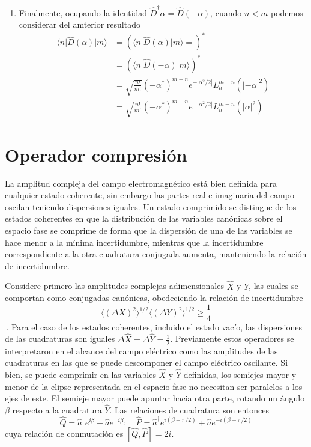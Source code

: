 \begin{enumerate}
  \item Finalmente, ocupando la identidad $\hat{D}^\dagger{\alpha} = \hat{D}(-\alpha)$, cuando $n<m$ podemos considerar del amterior resultado
        \begin{align*}
          \langle n \vert \hat{D}(\alpha)\vert m\rangle & = \left( \langle n \vert \hat{D}(\alpha) \vert m\rangle = \right)^{*}            \\
                                                        & = \left( \langle n \vert \hat{D}(-\alpha) \vert m\rangle \right)^{*}             \\
                                                        & = \sqrt{\frac{n!}{m!}}(-\alpha^*)^{m-n} e^{-|\alpha^2/2|}L_n^{m-n} (|-\alpha|^2) \\
                                                        & = \sqrt{\frac{n!}{m!}}(-\alpha^*)^{m-n} e^{-|\alpha^2/2|}L_n^{m-n} (|\alpha|^2)
        \end{align*}
\end{enumerate}

\section{Operador compresión}


La amplitud compleja del campo electromagnético está bien definida para cualquier estado coherente, sin embargo las partes real e imaginaria del campo oscilan teniendo dispersiones iguales. Un estado comprimido se distingue de los estados coherentes en que la distribución de las variables canónicas sobre el espacio fase se comprime de forma que la dispersión de una de las variables se hace menor a la mínima incertidumbre, mientras que la incertidumbre correspondiente a la otra cuadratura conjugada aumenta, manteniendo la relación de incertidumbre.

Considere primero las amplitudes complejas adimensionales $\hat{X}$ y $\hat{Y}$, las cuales se comportan como conjugadas canónicas, obedeciendo la relación de incertidumbre
\begin{equation*}
  \langle (\Delta X)^2 \rangle ^{1/2} \langle (\Delta Y)^2 \rangle ^{1/2} \geq \frac{1}{4}
\end{equation*}\,.
Para el caso de los estados coherentes, incluido el estado vacío, las dispersiones de las cuadraturas son iguales $\Delta \hat{X} = \Delta \hat{Y} = \frac{1}{2}$. Previamente estos operadores se interpretaron en el alcance del campo eléctrico como las amplitudes de las cuadraturas en las que se puede descomponer el campo eléctrico oscilante. Si bien, se puede comprimir en las variables $\hat{X}$ y $\hat{Y}$ definidas, los semiejes mayor y menor de la elipse representada en el espacio fase no necesitan ser paralelos a los ejes de este. El semieje mayor puede apuntar hacia otra parte, rotando un ángulo $\beta$ respecto a la cuadratura $\hat{Y}$. Las relaciones de cuadratura son entonces
\begin{equation*}
  \hat{Q} = \hat{a}^{\dagger} e^{i\beta} + \hat{a} e^{-i\beta}; \quad \hat{P} = \hat{a}^{\dagger} e^{i(\beta + \pi/2)} + \hat{a} e^{-i(\beta + \pi/2)}
\end{equation*}
cuya relación de conmutación es $[\hat{Q}, \hat{P}] = 2i$.

